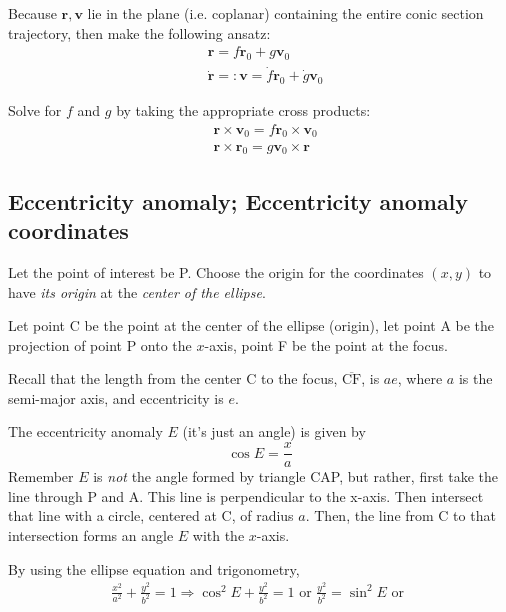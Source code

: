 Because $\mathbf{r}, \mathbf{v}$ lie in the plane (i.e. coplanar) containing the entire conic section trajectory, then make the following ansatz:
\begin{equation}
\begin{aligned}
& \mathbf{r} = f\mathbf{r}_0 + g \mathbf{v}_0 \\ 
& \dot{\mathbf{r}} =: \mathbf{v} = \dot{f} \mathbf{r}_0 + \dot{g} \mathbf{v}_0
\end{aligned} 
\end{equation}

Solve for $f$ and $g$ by taking the appropriate cross products:
\begin{equation}\label{dgdt:Eq:fAndgSeparatedByCrossProducts}
\begin{aligned} 
	& \mathbf{r} \times \mathbf{v}_0 = f\mathbf{r}_0 \times \mathbf{v}_0 \\ 
	& \mathbf{r} \times \mathbf{r}_0 = g \mathbf{v}_0 \times \mathbf{r} 
\end{aligned}
\end{equation}

\subsection{Eccentricity anomaly; Eccentricity anomaly coordinates}

Let the point of interest be P. Choose the origin for the coordinates $(x, y)$ to have \emph{its origin} at the \emph{center of the ellipse}. 

Let point C be the point at the center of the ellipse (origin), let point A be the projection of point P onto the $x$-axis, point F be the point at the focus.

Recall that the length from the center C to the focus, $\overline{\text{CF}}$, is $ae$, where $a$ is the semi-major axis, and eccentricity is $e$. 

The eccentricity anomaly $E$ (it's just an angle) is given by
\begin{equation}
\cos{E} = \frac{x}{a}
\end{equation}
Remember $E$ is \emph{not} the angle formed by triangle CAP, but rather, first take the line through P and A. This line is perpendicular to the x-axis. Then intersect that line with a circle, centered at C, of radius $a$. Then, the line from C to that intersection forms an angle $E$ with the $x$-axis.

By using the ellipse equation and trigonometry,
\[
\begin{gathered}
	\frac{x^2}{a^2} + \frac{y^2}{b^2} = 1 \Longrightarrow \cos^2{E}  + \frac{y^2}{b^2} = 1 \text{ or } \frac{y^2}{b^2} = \sin^2{E} \text{ or } 
\end{gathered}
\]

